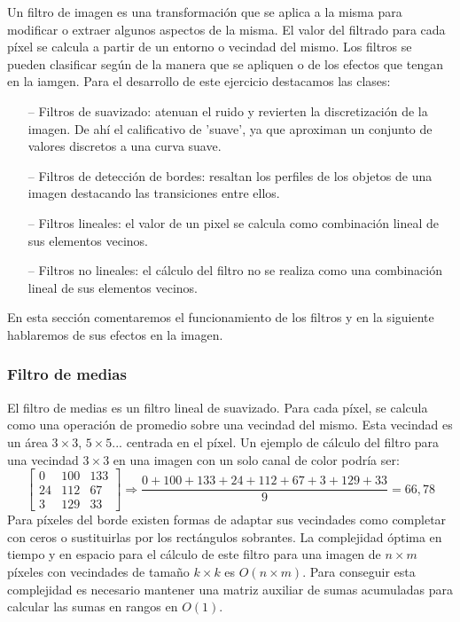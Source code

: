 \documentclass[12pt]{article}
\begin{document}
Un filtro de imagen es una transformación que se aplica a la misma para modificar o extraer algunos aspectos de la misma. 
El valor del filtrado para cada píxel se calcula a partir de un entorno o vecindad del mismo.
Los filtros se pueden clasificar según de la manera que se apliquen o de los efectos que tengan en la iamgen.
Para el desarrollo de este ejercicio destacamos las clases:
\begin{itemize}
    \item[--] Filtros de suavizado: atenuan el ruido y revierten la discretización de la imagen. De ahí el calificativo de 'suave', ya que aproximan un conjunto de valores discretos a una curva suave.
    \item[--] Filtros de detección de bordes: resaltan los perfiles de los objetos de una imagen destacando las transiciones entre ellos.
    \item[--] Filtros lineales: el valor de un pixel se calcula como combinación lineal de sus elementos vecinos.
    \item[--] Filtros no lineales: el cálculo del filtro no se realiza como una combinación lineal de sus elementos vecinos.
\end{itemize}
En esta sección comentaremos el funcionamiento de los filtros y en la siguiente hablaremos de sus efectos en la imagen.

\subsubsection{Filtro de medias}

El filtro de medias es un filtro lineal de suavizado. 
Para cada píxel, se calcula como una operación de promedio sobre una vecindad del mismo.
Esta vecindad es un área $3\times 3$, $5\times 5$... centrada en el píxel.
Un ejemplo de cálculo del filtro para una vecindad $3\times 3$ en una imagen con un solo canal de color podría ser:
$$
\begin{bmatrix}
0 & 100 & 133 \\
24 & 112 & 67 \\
3 & 129 & 33
\end{bmatrix}
\Rightarrow \frac{0+100+133+24+112+67+3+129+33}{9} = 66,78
$$
Para píxeles del borde existen formas de adaptar sus vecindades como completar con ceros o sustituirlas por los rectángulos sobrantes.
La complejidad óptima en tiempo y en espacio para el cálculo de este filtro para una imagen de $n\times m$ píxeles con vecindades de tamaño $k \times k$ es $O(n\times m)$. 
Para conseguir esta complejidad es necesario mantener una matriz auxiliar de sumas acumuladas para calcular las sumas en rangos en $O(1)$.
\end{document}
